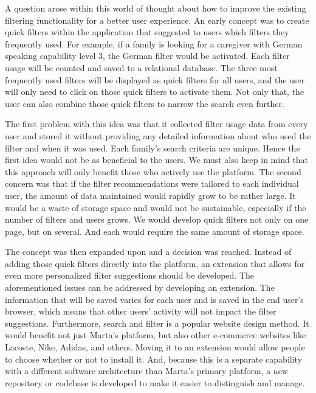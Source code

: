 A question arose within this world of thought about how to improve the existing filtering functionality for a better user experience. An early concept was to create quick filters within the application that suggested to users which filters they frequently used. For example, if a family is looking for a caregiver with German speaking capability level 3, the German filter would be activated. Each filter usage will be counted and saved to a relational database. The three most frequently used filters will be displayed as quick filters for all users, and the user will only need to click on those quick filters to activate them. Not only that, the user can also combine those quick filters to narrow the search even further.

The first problem with this idea was that it collected filter usage data from every user and stored it without providing any detailed information about who used the filter and when it was used. Each family's search criteria are unique. Hence the first idea would not be as beneficial to the users. We must also keep in mind that this approach will only benefit those who actively use the platform. The second concern was that if the filter recommendations were tailored to each individual user, the amount of data maintained would rapidly grow to be rather large. It would be a waste of storage space and would not be sustainable, especially if the number of filters and users grows. We would develop quick filters not only on one page, but on several. And each would require the same amount of storage space.

The concept was then expanded upon and a decision was reached. Instead of adding those quick filters directly into the platform, an extension that allows for even more personalized filter suggestions should be developed. The aforementioned issues can be addressed by developing an extension. The information that will be saved varies for each user and is saved in the end user's browser, which means that other users' activity will not impact the filter suggestions. Furthermore, search and filter is a popular website design method. It would benefit not just Marta's platform, but also other e-commerce websites like Lacoste, Nike, Adidas, and others. Moving it to an extension would allow people to choose whether or not to install it. And, because this is a separate capability with a different software architecture than Marta's primary platform, a new repository or codebase is developed to make it easier to distinguish and manage.

